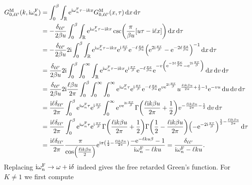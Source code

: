 \documentclass[english, parskip=full]{scrartcl}
\begin{document}
\begin{align}
G_{0,\ell\ell'}^\M(k,\i\omega_n^\F) &= \intx{0}{\beta}{\intr{\powe{\i \omega_n^\F\tau - \i kx} G_{0,\ell\ell'}^\M(x,\tau)}{x} }{\tau} \\
&= -\frac{\delta_{\ell\ell'}}{2\beta u} \intx{0}{\beta}{\intr{\powe{\i \omega_n^\F\tau - \i kx} \csc\kla*{\frac{\pi}{\beta u} \klb*{u\tau - \i\ell x}}}{x} }{\tau} \\
&= -\frac{\delta_{\ell\ell'}}{2\beta u} 2\i \intx{0}{\beta}{\intr{\powe{\i \omega_n^\F\tau - \i kx} \powe{\i \frac{\pi\tau}{\beta}} \powe{-\ell \frac{\pi x}{\beta u}}\kla*{\powe{2\i \frac{\pi\tau}{\beta}} - \powe{-2\ell \frac{\pi x}{\beta u}}}^{-1}}{x} }{\tau}\\
&= \frac{\delta_{\ell\ell'}}{2\beta u} 2\i \intx{0}{\beta}{\intx{0}{\infty}{\intr{\powe{\i \omega_n^\F\tau - \i kx} \powe{\i \frac{\pi\tau}{\beta}} \powe{-\ell \frac{\pi x}{\beta u}} \powe{- v\kla*{\powe{-2\ell \frac{\pi x}{\beta u}} - \powe{2\i \frac{\pi\tau}{\beta}}}} }{x}}{v} }{\tau}\\
&= \frac{\delta_{\ell\ell'}}{2\beta u} 2\i \frac{\ell\beta u}{2\pi} \intx{0}{\beta}{\intx{0}{\infty}{\intx{0}{\infty}{\powe{\i \omega_n^\F\tau} \powe{\i \frac{\pi\tau}{\beta}} \powe{-\ell \frac{\pi x}{\beta u}} \powe{v\powe{2\i \frac{\pi\tau}{\beta}}} u^{\frac{\ell\i k\beta u}{2\pi} + \frac{1}{2} - 1} \powe{-vu} }{u}}{v} }{\tau}\\
&= \frac{\i\ell \delta_{\ell\ell'}}{2\pi} \intx{0}{\beta}{\powe{\i\omega_n^\F\tau} \powe{\i \frac{\pi\tau}{\beta}} \intx{0}{\infty}{\powe{v\powe{2\i \frac{\pi\tau}{\beta}}} \Gamma\kla*{\frac{\ell\i k\beta u}{2\pi} + \frac{1}{2}} v^{-\frac{\ell\i k\beta u}{2\pi} - \frac{1}{2}} }{v} }{\tau}\\
&= \frac{\i\ell \delta_{\ell\ell'}}{2\pi} \intx{0}{\beta}{\powe{\i\omega_n^\F\tau} \powe{\i \frac{\pi\tau}{\beta}}  \Gamma\kla*{\frac{\ell\i k\beta u}{2\pi} + \frac{1}{2}} \Gamma\kla*{\frac{1}{2} - \frac{\ell\i k\beta u}{2\pi}} \kla*{-\powe{-2\i\frac{\pi\tau}{\beta}}}^{\frac{1}{2} - \frac{\ell\i k\beta u}{2\pi}} }{\tau}\\
&= \frac{\i\ell \delta_{\ell\ell'}}{2\pi} \frac{\pi}{\cos\kla*{\frac{\ell\i k\beta u}{2}}} \powe{\i\pi \kla*{\frac{1}{2} - \frac{\ell \i k\beta u}{2\pi}}} \frac{-\powe{-\ell ku\beta} -1}{\i\omega_n^\F - \ell ku} = \frac{\delta_{\ell\ell'}}{\i\omega_n^\F - \ell ku}.
\end{align}
Replacing $\text{i}\omega_n^{\text{F}} \rightarrow \omega + \text{i}\delta$ indeed gives the free retarded Green's function.
For $K\neq 1$ we first compute
\end{document}
